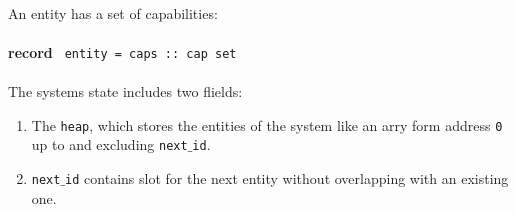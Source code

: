 \documentclass[11pt,a4paper,twoside]{article}
\begin{document}
	\\ \\ \\
	An entity has a set of capabilities: \\ \\
	{
	\textbf{record } \texttt{ 						
	entity = caps :: cap set}} \\ \\
	The systems state includes two flields: 
	\begin{enumerate}
	\item The \texttt{heap}, which stores the entities of the system like an arry form address \texttt{0} up to and excluding \texttt{next$\_$id}.
	\item \texttt{next$\_$id} contains slot for the next entity without overlapping with an existing one. 
	\end{enumerate} 
\end{document}
